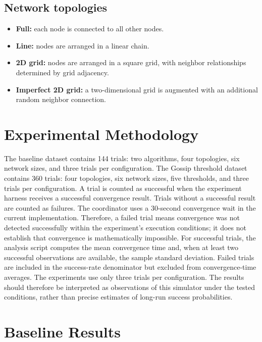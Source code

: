 \documentclass[11pt]{article}
\begin{document}
\subsection{Network topologies}
\par
\begin{itemize}
\item \textbf{Full:} each node is connected to all other nodes.
\item \textbf{Line:} nodes are arranged in a linear chain.
\item \textbf{2D grid:} nodes are arranged in a square grid,
with neighbor relationships determined by grid adjacency.
\item \textbf{Imperfect 2D grid:} a two-dimensional grid is
augmented with an additional random neighbor connection.
\end{itemize}
\par
\section{Experimental Methodology}
The baseline dataset contains 144 trials: two algorithms, four
topologies, six network sizes, and three trials per configuration.
The Gossip threshold dataset contains 360 trials: four topologies,
six network sizes, five thresholds, and three trials per
configuration.
A trial is counted as successful when the experiment harness receives
a successful convergence result. Trials without a successful result
are counted as failures. The coordinator uses a 30-second
convergence wait in the current implementation. Therefore, a failed
trial means convergence was not detected successfully within the
experiment's execution conditions; it does not establish that
convergence is mathematically impossible.
For successful trials, the analysis script computes the mean
convergence time and, when at least two successful observations are
available, the sample standard deviation. Failed trials are included
in the success-rate denominator but excluded from convergence-time
averages.
The experiments use only three trials per configuration. The results
should therefore be interpreted as observations of this simulator
under the tested conditions, rather than precise estimates of
long-run success probabilities.
\par
\section{Baseline Results}
\par
\end{document}
